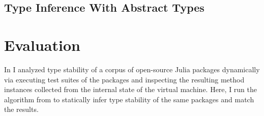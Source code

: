 

\subsection{Type Inference With Abstract Types}


\section{Evaluation}%
\label{sec:approx:eval}

In  I analyzed type stability of a corpus of open-source
Julia packages dynamically via executing test suites of the packages and
inspecting the resulting method instances collected from the internal state of
the virtual machine. Here, I run the algorithm from  to
statically infer type stability of the same packages and match the
results.
